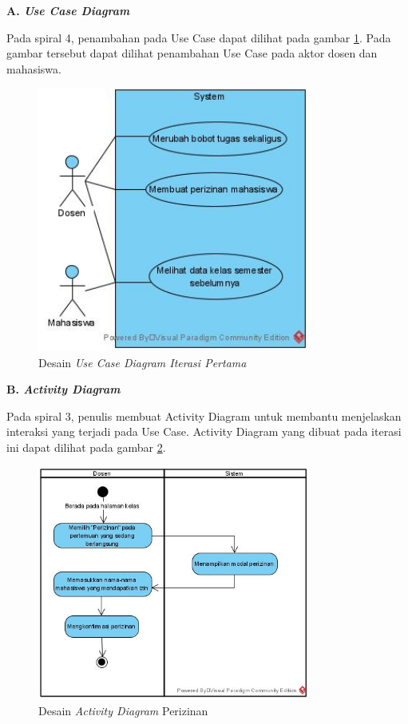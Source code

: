 \textbf{A. \textit{Use Case Diagram}}

	Pada spiral 4, penambahan pada Use Case dapat dilihat pada gambar \ref{fig:usecase4th}. Pada gambar tersebut dapat dilihat penambahan Use Case pada aktor dosen dan mahasiswa. 

\begin{figure}[h!]
	\centering
	\includegraphics[width=0.8\textwidth]{gambar/diagram/Use Case Iteration 4}
	\caption{Desain \textit{Use Case Diagram Iterasi Pertama}}
	\label{fig:usecase4th}
\end{figure}

\textbf{B. \textit{Activity Diagram}}

	Pada spiral 3, penulis membuat Activity Diagram untuk membantu menjelaskan interaksi yang terjadi pada Use Case. Activity Diagram yang dibuat pada iterasi ini dapat dilihat pada gambar \ref{fig:actperizinan}.

\begin{figure}[h!]
	\centering
	\includegraphics[width=0.8\textwidth]{gambar/diagram/perizinan}
	\caption{Desain \textit{Activity Diagram} Perizinan}
	\label{fig:actperizinan}
\end{figure}

